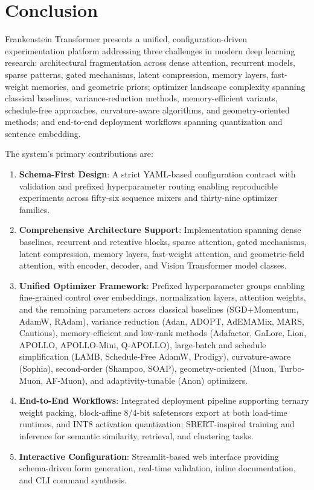 \section{Conclusion}
\label{sec:conclusion}

Frankenstein Transformer presents a unified, configuration-driven experimentation platform addressing three challenges in modern deep learning research: architectural fragmentation across dense attention, recurrent models, sparse patterns, gated mechanisms, latent compression, memory layers, fast-weight memories, and geometric priors; optimizer landscape complexity spanning classical baselines, variance-reduction methods, memory-efficient variants, schedule-free approaches, curvature-aware algorithms, and geometry-oriented methods; and end-to-end deployment workflows spanning quantization and sentence embedding.

The system's primary contributions are:
\begin{enumerate}[leftmargin=*]
    \item \textbf{Schema-First Design}: A strict YAML-based configuration contract with validation and prefixed hyperparameter routing enabling reproducible experiments across fifty-six sequence mixers and thirty-nine optimizer families.
    \item \textbf{Comprehensive Architecture Support}: Implementation spanning dense baselines, recurrent and retentive blocks, sparse attention, gated mechanisms, latent compression, memory layers, fast-weight attention, and geometric-field attention, with encoder, decoder, and Vision Transformer model classes.
    \item \textbf{Unified Optimizer Framework}: Prefixed hyperparameter groups enabling fine-grained control over embeddings, normalization layers, attention weights, and the remaining parameters across classical baselines (SGD+Momentum, AdamW, RAdam), variance reduction (Adan, ADOPT, AdEMAMix, MARS, Cautious), memory-efficient and low-rank methods (Adafactor, GaLore, Lion, APOLLO, APOLLO-Mini, Q-APOLLO), large-batch and schedule simplification (LAMB, Schedule-Free AdamW, Prodigy), curvature-aware (Sophia), second-order (Shampoo, SOAP), geometry-oriented (Muon, Turbo-Muon, AF-Muon), and adaptivity-tunable (Anon) optimizers.
    \item \textbf{End-to-End Workflows}: Integrated deployment pipeline supporting ternary weight packing, block-affine 8/4-bit safetensors export at both load-time runtimes, and INT8 activation quantization; SBERT-inspired training and inference for semantic similarity, retrieval, and clustering tasks.
    \item \textbf{Interactive Configuration}: Streamlit-based web interface providing schema-driven form generation, real-time validation, inline documentation, and CLI command synthesis.
\end{enumerate}

